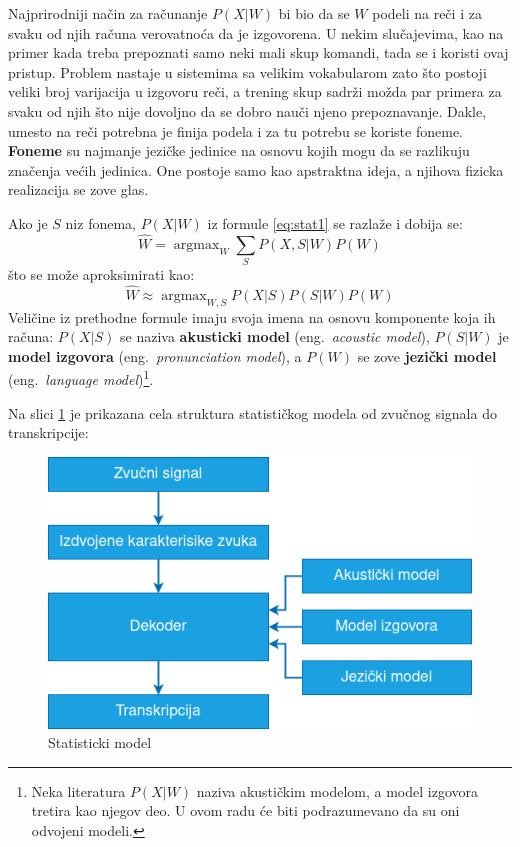 \documentclass[a4paper]{article}
\DeclareMathOperator*{\argmax}{argmax}
\begin{document}
Najprirodniji način za računanje $P(X|W)$ bi bio da se $W$ podeli na reči i za svaku od njih računa verovatnoća da je izgovorena.
U nekim slučajevima, kao na primer kada treba prepoznati samo neki mali skup komandi, tada se i koristi ovaj pristup.
Problem nastaje u sistemima sa velikim vokabularom zato što postoji veliki broj varijacija u izgovoru reči, a trening skup sadrži možda par primera za svaku od njih što nije dovoljno da se dobro nauči njeno prepoznavanje.
Dakle, umesto na reči potrebna je finija podela i za tu potrebu se koriste foneme.
\textbf{Foneme} su najmanje jezičke jedinice na osnovu kojih mogu da se razlikuju značenja većih jedinica.
One postoje samo kao apstraktna ideja, a njihova fizicka realizacija se zove glas.

Ako je $S$ niz fonema, $P(X|W)$ iz formule \ref{eq:stat1} se razlaže i dobija se:
\begin{equation*}
  \hat{W} = \argmax_{W} \sum_{S} P(X,S|W) P(W)
\end{equation*}
što se može aproksimirati kao:
\begin{equation}
  \label{eq:stat2}
  \hat{W} \approx \argmax_{W,S} P(X|S) P(S|W) P(W)
\end{equation}
Veličine iz prethodne formule imaju svoja imena na osnovu komponente koja ih računa:
$P(X|S)$ se naziva \textbf{akusticki model} (eng.~{\em acoustic model}), 
$P(S|W)$ je \textbf{model izgovora} (eng.~{\em pronunciation model}),
a $P(W)$ se zove \textbf{jezički model} (eng.~{\em language model})\footnote{Neka literatura $P(X|W)$ naziva akustičkim modelom, a model izgovora tretira kao njegov deo. U ovom radu će biti podrazumevano da su oni odvojeni modeli.}.

Na slici \ref{fig:statistical_model} je prikazana cela struktura statističkog modela od zvučnog signala do transkripcije:
\begin{figure}[h!]
  \begin{center}
    \includegraphics[scale=0.5]{statistical_model.png}
  \end{center}
  \caption{Statisticki model}
  \label{fig:statistical_model}
\end{figure}
\end{document}
